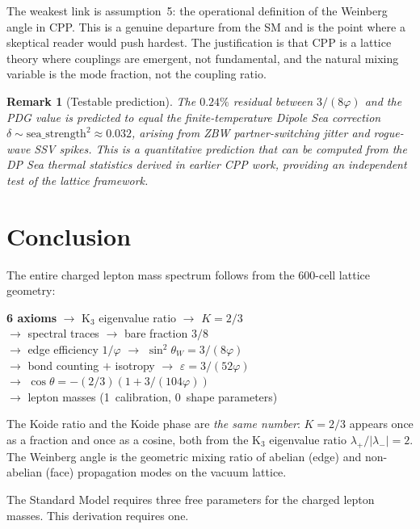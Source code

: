 \documentclass[11pt,letterpaper]{article}
\newtheorem{remark}[theorem]{Remark}
\newcommand{\phig}{\varphi}
\begin{document}
The weakest link is assumption~5: the operational definition of the Weinberg angle in CPP. This is a genuine departure from the SM and is the point where a skeptical reader would push hardest. The justification is that CPP is a lattice theory where couplings are emergent, not fundamental, and the natural mixing variable is the mode fraction, not the coupling ratio.

\begin{remark}[Testable prediction]
The $0.24\%$ residual between $3/(8\phig)$ and the PDG value is predicted to equal the finite-temperature Dipole Sea correction $\delta \sim \text{sea\_strength}^2 \approx 0.032$, arising from ZBW partner-switching jitter and rogue-wave SSV spikes. This is a quantitative prediction that can be computed from the DP Sea thermal statistics derived in earlier CPP work, providing an independent test of the lattice framework.
\end{remark}

\section{Conclusion}
The entire charged lepton mass spectrum follows from the 600-cell lattice geometry:

\begin{center}
\textbf{6 axioms} $\to$ K$_3$ eigenvalue ratio $\to$ $K = 2/3$ \\
$\to$ spectral traces $\to$ bare fraction $3/8$ \\
$\to$ edge efficiency $1/\phig$ $\to$ $\sin^2\theta_W = 3/(8\phig)$ \\
$\to$ bond counting $+$ isotropy $\to$ $\varepsilon = 3/(52\phig)$ \\
$\to$ $\cos\theta = -(2/3)(1 + 3/(104\phig))$ \\
$\to$ lepton masses (1~calibration, 0~shape parameters)
\end{center}

The Koide ratio and the Koide phase are \emph{the same number}: $K = 2/3$ appears once as a fraction and once as a cosine, both from the K$_3$ eigenvalue ratio $\lambda_+/|\lambda_-| = 2$. The Weinberg angle is the geometric mixing ratio of abelian (edge) and non-abelian (face) propagation modes on the vacuum lattice.

The Standard Model requires three free parameters for the charged lepton masses. This derivation requires one.
\end{document}
